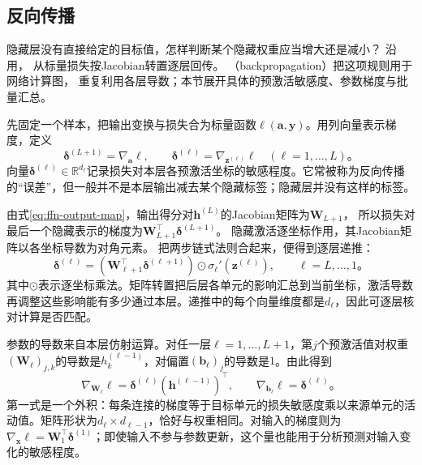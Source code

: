 \subsection{反向传播}
\label{sec:ffn-backpropagation}

隐藏层没有直接给定的目标值，怎样判断某个隐藏权重应当增大还是减小？
沿用，
从标量损失按Jacobian转置逐层回传。
（backpropagation）把这项规则用于网络计算图，
重复利用各层导数；本节展开具体的预激活敏感度、参数梯度与批量汇总。

先固定一个样本，把输出变换与损失合为标量函数$\ell(\bm{a},\bm{y})$。用列向量表示梯度，定义
\begin{equation}
  \bm{\delta}^{(L+1)}=\nabla_{\bm{a}}\ell,
  \qquad
  \bm{\delta}^{(\ell)}=\nabla_{\bm{z}^{(\ell)}}\ell
  \quad(\ell=1,\ldots,L)\text{。}
  \label{eq:ffn-delta-definition}
\end{equation}
向量$\bm{\delta}^{(\ell)}\in\mathbb{R}^{d_\ell}$记录损失对本层各预激活坐标的敏感程度。它常被称为反向传播的“误差”，但一般并不是本层输出减去某个隐藏标签；隐藏层并没有这样的标签。

由式\eqref{eq:ffn-output-map}，输出得分对$\bm{h}^{(L)}$的Jacobian矩阵为$\bm{W}_{L+1}$，
所以损失对最后一个隐藏表示的梯度为$\bm{W}_{L+1}^{\top}\bm{\delta}^{(L+1)}$。
隐藏激活逐坐标作用，其Jacobian矩阵以各坐标导数为对角元素。
把两步链式法则合起来，便得到逐层递推：
\begin{equation}
  \bm{\delta}^{(\ell)}=
  \left(\bm{W}_{\ell+1}^{\top}\bm{\delta}^{(\ell+1)}\right)
  \odot\sigma_\ell'\!\left(\bm{z}^{(\ell)}\right),
  \qquad \ell=L,\ldots,1\text{。}
  \label{eq:ffn-backward-recursion}
\end{equation}
其中$\odot$表示逐坐标乘法。矩阵转置把后层各单元的影响汇总到当前坐标，激活导数再调整这些影响能有多少通过本层。递推中的每个向量维度都是$d_\ell$，因此可逐层核对计算是否匹配。

参数的导数来自本层仿射运算。对任一层$\ell=1,\ldots,L+1$，第$j$个预激活值对权重$(\bm{W}_\ell)_{j,k}$的导数是$h_k^{(\ell-1)}$，对偏置$(\bm{b}_\ell)_j$的导数是$1$。由此得到
\begin{equation}
  \nabla_{\bm{W}_\ell}\ell
    =\bm{\delta}^{(\ell)}(\bm{h}^{(\ell-1)})^{\top},
  \qquad
  \nabla_{\bm{b}_\ell}\ell=\bm{\delta}^{(\ell)}\text{。}
  \label{eq:ffn-parameter-gradients}
\end{equation}
第一式是一个外积：每条连接的梯度等于目标单元的损失敏感度乘以来源单元的活动值。矩阵形状为$d_\ell\times d_{\ell-1}$，恰好与权重相同。对输入的梯度则为$\nabla_{\bm{x}}\ell=\bm{W}_1^{\top}\bm{\delta}^{(1)}$；即使输入不参与参数更新，这个量也能用于分析预测对输入变化的敏感程度。


